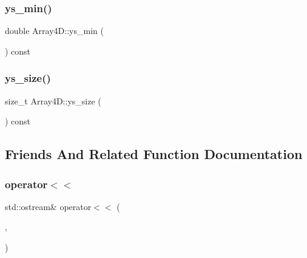 \mbox{\label{class_array4_d_af27f181faf93d0ca96e65b1e5bdab82d}} 
\subsubsection{\texorpdfstring{ys\+\_\+min()}{ys\_min()}}
{\footnotesize\ttfamily double Array4\+D\+::ys\+\_\+min (\begin{DoxyParamCaption}{ }\end{DoxyParamCaption}) const}

\mbox{\label{class_array4_d_a7c08ac86562c729d9fa24165cba55a97}} 
\subsubsection{\texorpdfstring{ys\+\_\+size()}{ys\_size()}}
{\footnotesize\ttfamily size\+\_\+t Array4\+D\+::ys\+\_\+size (\begin{DoxyParamCaption}{ }\end{DoxyParamCaption}) const}



\subsection{Friends And Related Function Documentation}
\mbox{\label{class_array4_d_af0c2770deee0bf3f3fc90fc3ea22147c}} 
\subsubsection{\texorpdfstring{operator$<$$<$}{operator<<}}
{\footnotesize\ttfamily std\+::ostream\& operator$<$$<$ (\begin{DoxyParamCaption}\item[{std\+::ostream \&}]{,  }\item[{\mbox{\hyperlink{class_array4_d}{Array4D}} const \&}]{ }\end{DoxyParamCaption})\hspace{0.3cm}{\ttfamily [friend]}}



